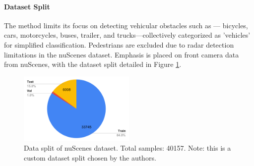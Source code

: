 \documentclass[report.tex]{subfiles}
\begin{document}



    \paragraph{Dataset Split}
    The method limits its focus on detecting vehicular obstacles such as — bicycles, cars, motorcycles, buses, trailer, and trucks—collectively categorized as 'vehicles' for simplified classification. Pedestrians are excluded due to radar detection limitations in the nuScenes dataset. Emphasis is placed on front camera data from nuScenes, with the dataset split detailed in Figure \ref{fig:saffcos_data_split}.

    \begin{figure}[h!]
        \centering
        \includegraphics[width=0.5\textwidth]{images/methods/saf_fcos/data_split.pdf}
        \caption{Data split of nuScenes dataset. Total samples: 40157. Note: this is a custom dataset split chosen by the authors.}
        \label{fig:saffcos_data_split}
    \end{figure}
\end{document}
